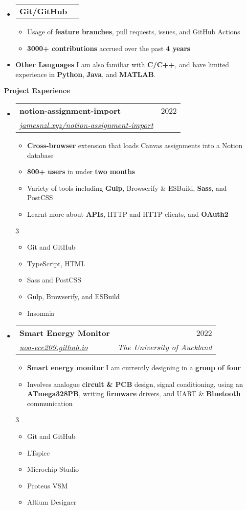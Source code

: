 \documentclass[11pt,a4paper]{article}[leftmargin=*]
\makeatletter
\def \entryspacing {-0pt}
\def \bulletstylei {\faAngleRight\hspace{-4.5pt}}
\def \bulletstyleii {\faCaretRight\hspace{-4.5pt}}
\renewcommand{\section}[2]{\vspace{5pt}
  \colorbox{secondary}{\color{white}\raggedbottom\normalsize\textbf{{#1}{\hspace{2pt}#2\hspace{4pt}}}}
}
\newcommand{\resumeEntryStart}{\begin{itemize}[leftmargin=2.5mm]}
\newcommand{\resumeEntryEnd}{\end{itemize}\vspace{\entryspacing}}
\newcommand{\resumeItemListStart}{\begin{itemize}[leftmargin=4.5mm]}
\newcommand{\resumeItemListEnd}{\end{itemize}}
\newcommand{\resumeItemListStartColumns}[2][-0.5]{\vspace*{#1\multicolsep}
\begin{multicols}{#2}\begin{itemize}[leftmargin=4.5mm]}
\newcommand{\resumeItemListEndColumns}[1][-1]{\end{itemize}\end{multicols}\vspace*{#1\multicolsep}}
\newcommand{\resumeItem}[2][\bulletstylei]{
  \item[\small#1]\small{
    {#2 \vspace{-2pt}}
  }
}
\newcommand{\resumeEntryTSDL}[4]{
  \vspace{-1pt}\item[]
    \begin{tabularx}{0.97\textwidth}{X@{\hspace{60pt}}r}
      \textbf{\color{primary}#1} & {\firabook\color{accent}\small#2} \\
      \textit{\color{accent}\small#3} & \textit{\color{accent}\small#4} \\
    \end{tabularx}\vspace{-6pt}
}
\newcommand{\resumeEntryTD}[2]{
  \vspace{-1pt}\item[]
    \begin{tabularx}{0.97\textwidth}{X@{\hspace{60pt}}r}
      \textbf{\color{primary}#1} & {\firabook\color{accent}\small#2} \\
    \end{tabularx}\vspace{-6pt}
}
\newcommand{\resumeEntryS}[2]{
  \item[]\small{
    \textbf{\color{primary}#1 }{ #2 \vspace{-2pt}}
  }
}
\newcommand{\resumeBf}[1]{\small\textbf{\color{halfbold}#1}}
\makeatother
\begin{document}
\vspace*{-0.5\baselineskip}

\resumeEntryStart
\resumeEntryTD
{Git/GitHub}{}
\resumeItemListStart
\resumeItem {Usage of \resumeBf{feature branches}, pull requests, issues, and GitHub Actions}
\resumeItem {\resumeBf{3000+ contributions} accrued over the past \resumeBf{4 years}}
\resumeItemListEnd
\resumeEntryEnd

\vspace*{-0.5\baselineskip}

\resumeEntryStart
\resumeEntryS
{Other Languages}{I am also familiar with \resumeBf{C/C++}, and have limited experience in \resumeBf{Python}, \resumeBf{Java}, and \resumeBf{MATLAB}.}
\resumeEntryEnd


\section{\faFlask}{Project Experience}

\resumeEntryStart
\resumeEntryTSDL
{notion-assignment-import}{2022}
{\href{https://jamesnzl.xyz/notion-assignment-import}{jamesnzl.xyz/notion-assignment-import}}{}
\resumeItemListStart
\resumeItem {\resumeBf{Cross-browser} extension that loads Canvas assignments into a Notion database}
\resumeItem {\resumeBf{800+ users} in under \resumeBf{two months}}
\resumeItem {Variety of tools including \resumeBf{Gulp}, Browserify \& ESBuild, \resumeBf{Sass}, and PostCSS}
\resumeItem {Learnt more about \resumeBf{APIs}, HTTP and HTTP clients, and \resumeBf{OAuth2}}
\resumeItemListEnd
\resumeItemListStartColumns{3}
\resumeItem[\bulletstyleii] {Git and GitHub}
\resumeItem[\bulletstyleii] {TypeScript, HTML}
\resumeItem[\bulletstyleii] {Sass and PostCSS}
\resumeItem[\bulletstyleii] {Gulp, Browserify, and ESBuild}
\resumeItem[\bulletstyleii] {Insomnia}
\resumeItemListEndColumns
\resumeEntryEnd

\vspace*{-0.5\baselineskip}

\resumeEntryStart
\resumeEntryTSDL
{Smart Energy Monitor}{2022}
{\href{https://uoa-ece209.github.io}{uoa-ece209.github.io}}{The University of Auckland}
\resumeItemListStart
\resumeItem {\resumeBf{Smart energy monitor} I am currently designing in a \resumeBf{group of four}}
\resumeItem {Involves analogue \resumeBf{circuit \& PCB} design, signal conditioning, using an \resumeBf{ATmega328PB}, writing \resumeBf{firmware} drivers, and UART \& \resumeBf{Bluetooth} communication}
\resumeItemListEnd
\resumeItemListStartColumns{3}
\resumeItem[\bulletstyleii] {Git and GitHub}
\resumeItem[\bulletstyleii] {LTspice}
\resumeItem[\bulletstyleii] {Microchip Studio}
\resumeItem[\bulletstyleii] {Proteus VSM}
\resumeItem[\bulletstyleii] {Altium Designer}
\resumeItemListEndColumns
\resumeEntryEnd
\end{document}
